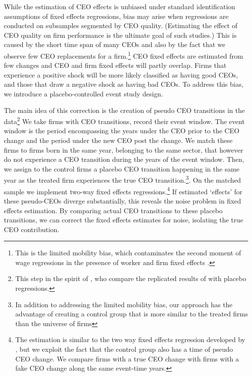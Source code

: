 \documentclass[11pt,a4paper]{article}
\begin{document}
While the estimation of CEO effects is unbiased under standard identification assumptions of fixed effects regressions, bias may arise when regressions are conducted on subsamples segmented by CEO quality. (Estimating the effect of CEO quality on firm performance is the ultimate goal of such studies.) This is caused by the short time span of many CEOs and also by the fact that we observe few CEO replacements for a firm.\footnote{This is the limited mobility bias, which contaminates the second moment of wage regressions in the presence of worker and firm fixed effects \cite{kline2024firm}.} CEO fixed effects are estimated from few changes and CEO and firm fixed effects will partly overlap. Firms that experience a positive shock will be more likely classified as having good CEOs, and those that draw a negative shock as having bad CEOs. To address this bias, we introduce a placebo-controlled event study design.

The main idea of this correction is the creation of pseudo CEO transitions in the data\footnote{This step in the spirit of \cite{jarosiewicz2023revisiting}, who compare the replicated results of  \cite{Bertrand2003-io} with placebo regressions.} We take firms with CEO transitions, record their event window. The event window is the period encompassing the years under the CEO prior to the CEO change and the period under the new CEO post the change. We match these firms to firms born in the same year, belonging to the same sector, that however do not experience a CEO transition during the years of the event window. Then, we assign to the control firms a placebo CEO transition happening in the same year as the treated firm experiences the true CEO transition.\footnote{In addition to addressing the limited mobility bias, our approach has the advantage of creating a control group that is more similar to the treated firms than the universe of firms}. On the matched sample we implement two-way fixed effects regressions.\footnote{The estimation is similar to the two way fixed effects regression developed by \cite{Callaway2021JoLE}, but we exploit the fact that the control group also has a time of pseudo CEO change. We compare firms with a true CEO change with firms with a fake CEO change along the same event-time years.} If estimated `effects' for these pseudo-CEOs diverge substantially, this reveals the noise problem in fixed effects estimation. By comparing actual CEO transitions to these placebo transitions, we can correct the fixed effects estimates for noise, isolating the true CEO contribution.
\end{document}
